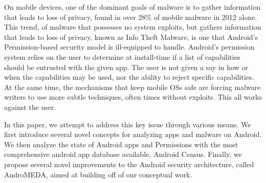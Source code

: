  On mobile devices, one of the dominant goals of malware is to gather information that leads to loss of privacy, found in over 28\% of mobile malware in 2012 alone\citep{nq2013}. This trend, of malware that possesses no system exploits, but gathers information that leads to loss of privacy, known as Info Theft Malware, is one that Android's Permission-based security model is ill-equipped to handle. Android's permission system relies on the user to determine at install-time if a list of capabilities should be entrusted with the given app. The user is not given a say in how or when the capabilities may be used, nor the ability to reject specific capabilities. At the same time, the mechanisms that keep mobile OSs safe are forcing malware writers to use more subtle techniques, often times without exploits. This all works against the user.

In this paper, we attempt to address this key issue through various means. We first introduce several novel concepts for analyzing apps and malware on Android. We then analyze the state of Android apps and Permissions with the most comprehensive android app database available, Android Census. Finally, we propose several novel improvements to the Android security architecture, called AndroMEDA, aimed at building off of our conceptual work.

